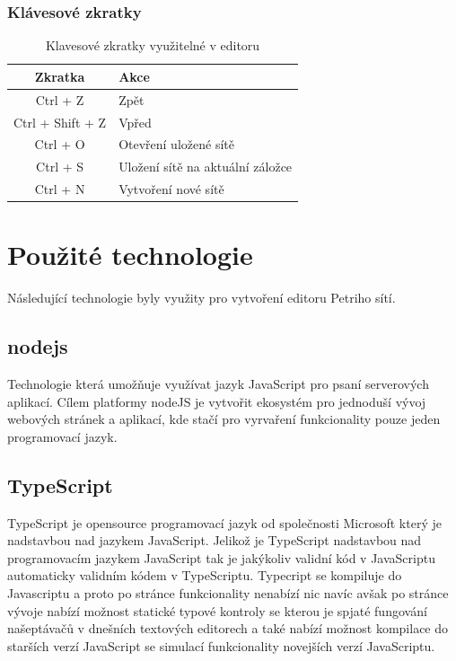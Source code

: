 \documentclass[
  biblatex,
  glossaries,
  index
]{kidiplom}
\begin{document}
\subsubsection{Klávesové zkratky}\label{zkratky}

\begin{table}[h!]
  \centering
  \begin{tabular}{| c | l |}
    \hline
    Zkratka & Akce \\
    \hline
    Ctrl + Z      & Zpět \\
    Ctrl + Shift + Z & Vpřed \\
    Ctrl + O & Otevření uložené sítě \\
    Ctrl + S & Uložení sítě na aktuální záložce\\
    Ctrl + N & Vytvoření nové sítě \\
    \hline
  \end{tabular}
  \caption{Klavesové zkratky využitelné v editoru}\label{tabulka zkratky}
\end{table}





\section{Použité technologie}

Následující technologie byly využity pro vytvoření editoru Petriho sítí.

\subsection{nodejs}
Technologie která umožňuje využívat jazyk JavaScript pro psaní 
serverových aplikací. Cílem platformy nodeJS je vytvořit
ekosystém pro jednoduší vývoj webových stránek a aplikací, 
kde stačí pro vyrvaření funkcionality pouze jeden programovací jazyk.

\subsection{TypeScript}
TypeScript je opensource programovací jazyk od společnosti Microsoft který je nadstavbou nad jazykem JavaScript.
Jelikož je TypeScript nadstavbou nad programovacím jazykem JavaScript tak je jakýkoliv validní kód v JavaScriptu automaticky validním kódem v TypeScriptu.
Typecript se kompiluje do Javascriptu a proto po stránce funkcionality nenabízí nic navíc avšak po stránce vývoje nabízí možnost statické typové kontroly
se kterou je spjaté fungování našeptávačů v dnešních textových editorech a také nabízí možnost kompilace do starších verzí JavaScript se simulací funkcionality novejších verzí JavaScriptu.
\end{document}
